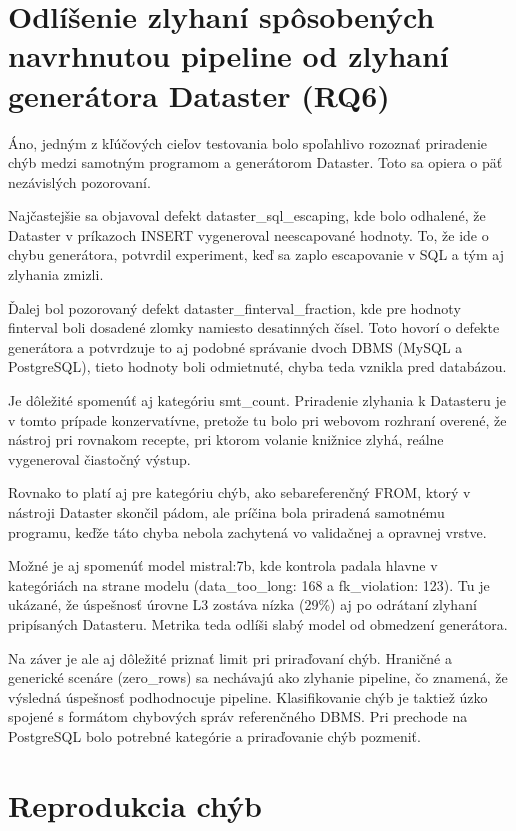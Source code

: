 \section{Odlíšenie zlyhaní spôsobených navrhnutou pipeline od zlyhaní generátora Dataster (RQ6)}
\label{sub:k8_odpoved_rq6}
Áno, jedným z kľúčových cieľov testovania bolo spoľahlivo rozoznať priradenie chýb medzi samotným programom a generátorom Dataster. Toto sa opiera o päť nezávislých pozorovaní.


Najčastejšie sa objavoval defekt dataster\_sql\_escaping, kde bolo odhalené, že Dataster v príkazoch INSERT vygeneroval neescapované hodnoty. To, že ide o chybu generátora, potvrdil experiment, keď sa zaplo escapovanie v SQL  a tým aj zlyhania zmizli. 


Ďalej bol pozorovaný defekt dataster\_finterval\_fraction, kde pre hodnoty finterval boli dosadené zlomky namiesto desatinných čísel. Toto hovorí o defekte generátora  a potvrdzuje to aj podobné správanie dvoch DBMS (MySQL a PostgreSQL), tieto hodnoty boli odmietnuté, chyba teda vznikla pred databázou.


Je dôležité spomenúť aj kategóriu smt\_count. Priradenie zlyhania k Datasteru je v tomto prípade konzervatívne, pretože tu bolo pri webovom rozhraní overené, že nástroj pri rovnakom recepte, pri ktorom volanie knižnice zlyhá, reálne vygeneroval  čiastočný výstup.


Rovnako to platí aj pre kategóriu chýb, ako sebareferenčný FROM, ktorý v nástroji Dataster skončil pádom, ale príčina bola priradená samotnému programu, keďže táto chyba nebola zachytená vo validačnej a opravnej vrstve. 


Možné je aj spomenúť  model mistral:7b, kde kontrola padala hlavne v kategóriách na strane modelu (data\_too\_long: 168 a fk\_violation: 123). Tu je ukázané, že úspešnosť úrovne L3 zostáva nízka (29\%) aj po odrátaní zlyhaní pripísaných Datasteru. Metrika teda odlíši slabý model od obmedzení generátora.


Na záver je ale aj dôležité priznať limit pri priraďovaní chýb. Hraničné a generické scenáre (zero\_rows) sa nechávajú ako zlyhanie pipeline, čo znamená, že výsledná úspešnosť podhodnocuje pipeline.  Klasifikovanie chýb je taktiež úzko spojené s formátom chybových správ referenčného DBMS. Pri prechode na PostgreSQL bolo potrebné kategórie a priraďovanie chýb pozmeniť.

\section{Reprodukcia chýb}

